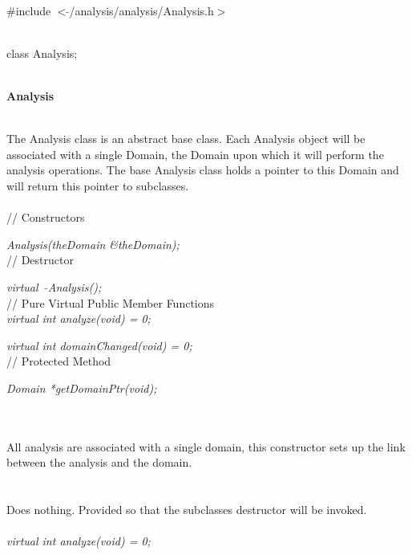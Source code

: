 
   \\
\#include $<\tilde{ }$/analysis/analysis/Analysis.h$>$  


  \\
class Analysis;  


 \\
{\bf Analysis} 


 \\ 
\indent The Analysis class is an abstract base class. Each Analysis
object will be associated with a single Domain, the Domain upon which
it will perform the analysis operations. The base Analysis class holds
a pointer to this Domain and will return this pointer to subclasses. \\

 \\ 
// Constructors  

{\em Analysis(theDomain \&theDomain);}\\  

// Destructor 

{\em virtual~ $\tilde{}$Analysis();}\\ 

\indent // Pure Virtual Public Member Functions \\ 
{\em virtual int analyze(void) = 0;} 

{\em virtual int domainChanged(void) = 0;} \\ 

// Protected Method 

{\em Domain *getDomainPtr(void);} 



\\ \\ 
All analysis are associated with a single domain, this constructor
sets up the link between the analysis and the domain. \\

 \\
\\ 
Does nothing. Provided so that the subclasses destructor will be
invoked. \\

\\
{\em virtual int analyze(void) = 0;} 

